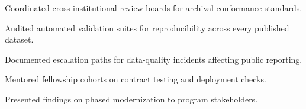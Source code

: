 \documentclass[fontsize=11pt, margin=normal, medium=print]{careerdossier-cv}
\begin{document}
\begin{CDossierEntry}[title = {Postgraduate Fellowship in Reliability Engineering}, organization = {Standards and Accessibility Institute}, dates = {2026}]
  \begin{CDossierItemize}
    \item Coordinated cross-institutional review boards for archival conformance standards.
    \item Audited automated validation suites for reproducibility across every published dataset.
    \item Documented escalation paths for data-quality incidents affecting public reporting.
    \item Mentored fellowship cohorts on contract testing and deployment checks.
    \item Presented findings on phased modernization to program stakeholders.
  \end{CDossierItemize}
\end{CDossierEntry}
\end{document}
